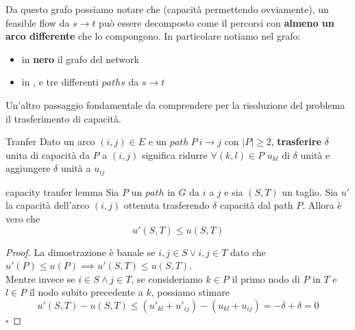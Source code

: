\documentclass[a4paper, 11pt]{report}
\newcommand*{\QED}{\null\nobreak\hfill\ensuremath{\square}}%
\begin{document}
Da questo grafo possiamo notare che (capacità permettendo ovviamente), un feasible flow da $s \rightarrow t$ può essere decomposto come il percorsi con \textbf{almeno un arco 
differente} che lo compongono. In particolare notiamo nel grafo:
\begin{itemize}
    \item  in \textbf{nero} il grafo del network
    \item in \textbf{\color{red}{rosso}}, \textbf{\color{green!70!black}{verde}} e \textbf{\color{blue}{blu}} tre differenti $paths$ da $s\rightarrow t$
\end{itemize}
\newpage
Un'altro passaggio fondamentale da comprendere per la risoluzione del problema il trasferimento di capacità.
\begin{definition}{Tranfer}{}
    Dato un arco $(i,j) \in E$ e un $path\ P\ i\rightarrow j$ con $|P|\ge 2$, \textbf{trasferire} $\delta$ unita di capacità da $P$ a $(i,j)$
    significa ridurre $\forall (k,l) \in P$ $u_{kl}$ di $\delta$ unità e aggiungere $\delta$ unità a $u_{ij}$ 
\end{definition}
\begin{lemma}{capacity tranfer lemma}{}
    Sia $P$ un $path$ in $G$ da $i$ a $j$ e sia $(S,T)$ un taglio. Sia $u'$ la capacità dell'arco $(i,j)$ ottenuta trasferendo $\delta$ capacità dal path $P$. Allora è vero che
    \[u'(S,T) \le u(S,T)\] 
\end{lemma}
\begin{proof}
    La dimostrazione è banale se $i,j \in S \lor i,j \in T$ dato che $u'(P) \le u(P) \implies u'(S,T)\le u(S,T)$.\\
    Mentre invece se $i\in S \land j \in T$, se consideriamo $k \in P$ il primo nodo di $P$ in $T$ e $l \in P$ il nodo subito precedente a $k$, possiamo stimare 
    \[u'(S,T)-u(S,T)\le (u'_{kl}+u'_{ij})- (u_{kl}+u_{ij}) = -\delta + \delta = 0\]\QED
\end{proof}
\end{document}
